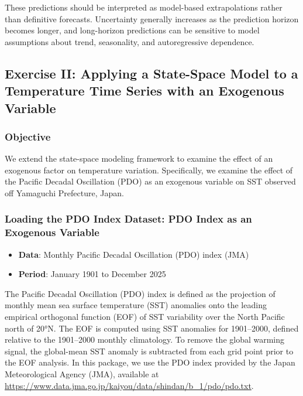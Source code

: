 \documentclass[
]{article}
\providecommand{\tightlist}{%
  \setlength{\itemsep}{0pt}\setlength{\parskip}{0pt}}
\begin{document}
These predictions should be interpreted as model-based extrapolations
rather than definitive forecasts. Uncertainty generally increases as the
prediction horizon becomes longer, and long-horizon predictions can be
sensitive to model assumptions about trend, seasonality, and
autoregressive dependence.

\subsection{Exercise II: Applying a State-Space Model to a Temperature
Time Series with an Exogenous
Variable}\label{exercise-ii-applying-a-state-space-model-to-a-temperature-time-series-with-an-exogenous-variable}

\subsubsection{Objective}\label{objective-1}

We extend the state-space modeling framework to examine the effect of an
exogenous factor on temperature variation. Specifically, we examine the
effect of the Pacific Decadal Oscillation (PDO) as an exogenous variable
on SST observed off Yamaguchi Prefecture, Japan.

\subsubsection{Loading the PDO Index Dataset: PDO Index as an Exogenous
Variable}\label{loading-the-pdo-index-dataset-pdo-index-as-an-exogenous-variable}

\begin{itemize}
\tightlist
\item
  \textbf{Data}: Monthly Pacific Decadal Oscillation (PDO) index (JMA)\\
\item
  \textbf{Period}: January 1901 to December 2025
\end{itemize}

The Pacific Decadal Oscillation (PDO) index is defined as the projection
of monthly mean sea surface temperature (SST) anomalies onto the leading
empirical orthogonal function (EOF) of SST variability over the North
Pacific north of 20°N. The EOF is computed using SST anomalies for
1901--2000, defined relative to the 1901--2000 monthly climatology. To
remove the global warming signal, the global-mean SST anomaly is
subtracted from each grid point prior to the EOF analysis. In this
package, we use the PDO index provided by the Japan Meteorological
Agency (JMA), available at
\url{https://www.data.jma.go.jp/kaiyou/data/shindan/b_1/pdo/pdo.txt}.
\end{document}
